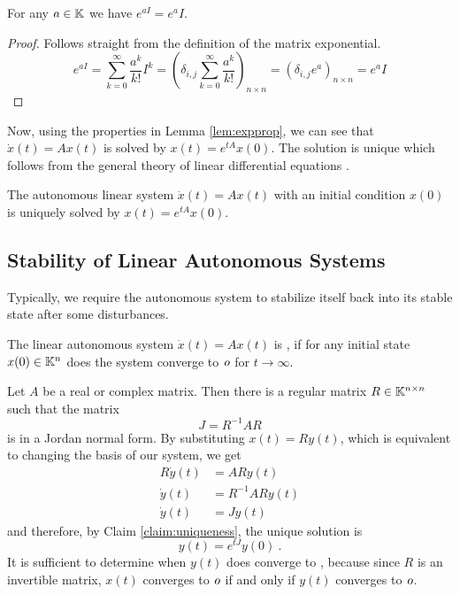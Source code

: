 \begin{lemma}
	\label{lem:matrixExpIdentity}
	For any $a\in\mathbb{K}$ we have $e^{a I}=e^{a}I$.
\end{lemma}

\begin{proof}
	Follows straight from the definition of the matrix exponential.
	$$e^{a I}=\sum^\infty_{k=0}\frac{a^k}{k!}I^k=\left(\delta_{i,j}\sum^\infty_{k=0}\frac{a^k}{k!}\right)_{n\times n}=\left(\delta_{i,j}e^a\right)_{n\times n}=e^aI$$
\end{proof}

Now, using the properties in Lemma \ref{lem:expprop}, we can see that $\dot{x}(t)=Ax(t)$ is solved by $x(t)=e^{tA}x(0)$. The solution is unique which follows from the general theory of linear differential equations \cite[see][Věta 13.5.1]{Pick}.

\begin{claim}
\label{claim:uniqueness}
	The autonomous linear system $\dot{x}(t)=Ax(t)$ with an initial condition $x(0)$ is uniquely solved by $x(t)=e^{tA}x(0)$.
\end{claim}

\subsection{Stability of Linear Autonomous Systems}

Typically, we require the autonomous system to stabilize itself back into its stable state after some disturbances.

\begin{definition}
	The linear autonomous system $\dot{x}(t)=Ax(t)$ is , if for any initial state $x(0)\in\mathbb{K}^n$ does the system converge to $\textit{o}$ for $t\to\infty$.
\end{definition}

Let $A$ be a real or complex matrix. Then there is a regular matrix $R\in \mathbb{K}^{n\times n}$ such that the matrix
$$J=R^{-1}AR$$
is in a Jordan normal form. By substituting $x(t)=Ry(t)$, which is equivalent to changing the basis of our system, we get 
\begin{align*}
	R\dot{y}(t)&=ARy(t) \\
	\dot{y}(t)&=R^{-1}ARy(t) \\
	\dot{y}(t)&=Jy(t)
\end{align*}
and therefore, by Claim \ref{claim:uniqueness}, the unique solution is
$$y(t)=e^{tJ}y(0)\ .$$
It is sufficient to determine when $y(t)$ does converge to \nullvector, because since $R$ is an invertible matrix, $x(t)$ converges to $\textit{o}$ if and only if $y(t)$ converges to $\textit{o}$.

